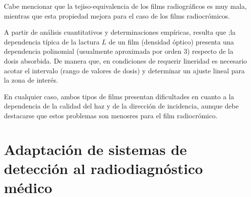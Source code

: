 %
Cabe mencionar que la tejiso-equivalencia de los films radiogr\'aficos es muy mala, mientras que esta propiedad mejora para el caso de los 
films
radiocr\'omicos.

A partir de an\'alisis cuantitativos y determinaciones emp\'iricas, resulta que ;la dependencia t\'ipica de la lactura $L$ de un film 
(densidad \'optico) 
presenta una dependencia polinomial (usualmente aproximada por orden 3) respecto de la dosis absorbida. De manera que, en condiciones de 
requerir lineridad
es necesario acotar el intervalo (rango de valores de dosis) y determinar un ajuste lineal para la zona de inter\'es.
%

%
En cualquier caso, ambos tipos de films presentan dificultades en cuanto a la dependencia de la calidad del haz y de la direcci\'on de 
incidencia, aunque
debe destacarse que estos problemas son menosres para el film radiocr\'omico.

 
 
\section{Adaptaci\'on de sistemas de detecci\'on al radiodiagn\'ostico m\'edico}
\label{CapIII_11}
